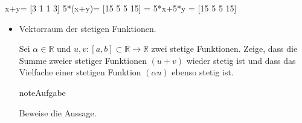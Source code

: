 \documentclass[letterpaper,10pt,english]{jupyterBook}
\begin{document}
\begin{sphinxVerbatim}[commandchars=\\\{\}]
   
  \PYG{p}{[}\PYG{p}{]}
  \PYG{p}{[}\PYG{p}{]}

\end{sphinxVerbatim}

\begin{sphinxVerbatim}[commandchars=\\\{\}]
x+y= [\PYGZhy{}3 \PYGZhy{}1  1  3]
5*(x+y)= [\PYGZhy{}15  \PYGZhy{}5   5  15] = 5*x+5*y =  [\PYGZhy{}15  \PYGZhy{}5   5  15]
\end{sphinxVerbatim}
\begin{itemize}
\item {} 
Vektorraum der stetigen Funktionen.

Sei \(\alpha \in \mathbb{R}\) und \(u,v : [a,b]\subset \mathbb{R} \to \mathbb{R}\) zwei stetige Funktionen. Zeige, dass die Summe zweier stetiger Funktionen \((u+v)\) wieder stetig ist und dass das Vielfache einer stetigen Funktion \((\alpha u)\) ebenso stetig ist.

\begin{sphinxadmonition}{note}{Aufgabe}

Beweise die Aussage.
\end{sphinxadmonition}

\end{itemize}
\end{document}

